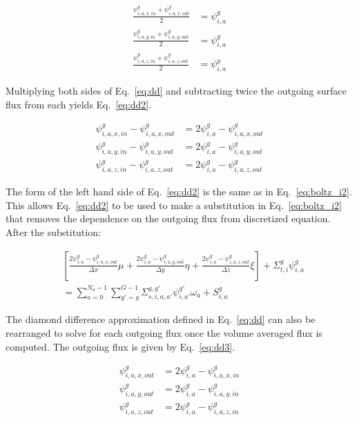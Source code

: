 \begin{equation} \label{eq:dd}
\begin{split}
\frac{\psi_{i,a,x,in}^g + \psi_{i,a,x,out}^g}{2} &= \psi_{i,a}^{g} \\
\frac{\psi_{i,a,y,in}^g + \psi_{i,a,y,out}^g}{2} &= \psi_{i,a}^{g} \\
\frac{\psi_{i,a,z,in}^g + \psi_{i,a,z,out}^g}{2} &= \psi_{i,a}^{g}
\end{split}
\end{equation}

Multiplying both sides of Eq.~\ref{eq:dd} and subtracting twice the outgoing surface flux from each yields Eq.~\ref{eq:dd2}.

\begin{equation} \label{eq:dd2}
\begin{split}
\psi_{i,a,x,in}^g - \psi_{i,a,x,out}^g &= 2\psi_{i,a}^{g} - \psi_{i,a,x,out}^g \\
\psi_{i,a,y,in}^g - \psi_{i,a,y,out}^g &= 2\psi_{i,a}^{g} - \psi_{i,a,y,out}^g \\
\psi_{i,a,z,in}^g - \psi_{i,a,z,out}^g &= 2\psi_{i,a}^{g} - \psi_{i,a,z,out}^g
\end{split}
\end{equation}

The form of the left hand side of Eq.~\ref{eq:dd2} is the same as in Eq.~\ref{eq:boltz_i2}. This allows Eq.~\ref{eq:dd2} to be used to make a substitution in Eq.~\ref{eq:boltz_i2} that removes the dependence on the outgoing flux from discretized equation. After the substitution:

\begin{equation} \label{eq:boltz_i3}
\begin{split}
&\left[ 
\frac{2\psi_{i,a}^{g} - \psi_{i,a,x,out}^g}{\Delta x} \mu + 
\frac{2\psi_{i,a}^{g} - \psi_{i,a,y,out}^g}{\Delta y} \eta + 
\frac{2\psi_{i,a}^{g} - \psi_{i,a,z,out}^g}{\Delta z} \xi
\right]
+ \Sigma_{t,i}^g \psi_{i,a}^{g} \\
& = 
\sum_{a=0}^{N_a-1} \sum_{g'=g}^{G-1} \Sigma_{s, i, a, a'}^{g, g'} \psi_{i, a'}^{g'} \omega_a + S_{i,a}^g
\end{split}
\end{equation}

The diamond difference approximation defined in Eq.~\ref{eq:dd} can also be rearranged to solve for each outgoing flux once the volume averaged flux is computed. The outgoing flux is given by Eq.~\ref{eq:dd3}.

\begin{equation} \label{eq:dd3}
\begin{split}
\psi_{i,a,x,out}^g &= 2\psi_{i,a}^{g} - \psi_{i,a,x,in}^g \\
\psi_{i,a,y,out}^g &= 2\psi_{i,a}^{g} - \psi_{i,a,y,in}^g \\
\psi_{i,a,z,out}^g &= 2\psi_{i,a}^{g} - \psi_{i,a,z,in}^g
\end{split}
\end{equation}

